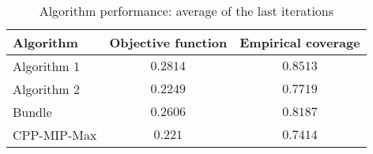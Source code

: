 \begin{table}[ht]
    \centering
    \begin{tabular}{lcc}
    \toprule
    \textbf{Algorithm} & \textbf{Objective function} & \textbf{Empirical coverage} \\
    \midrule
    Algorithm 1 & $0.2814$ & $0.8513$ \\
Algorithm 2 & $0.2249$ & $0.7719$ \\
Bundle & $0.2606$ & $0.8187$ \\
CPP-MIP-Max & $0.221$ & $0.7414$ \\
\bottomrule
    \end{tabular}
    \caption{Algorithm performance: average of the last iterations}
    \end{table}